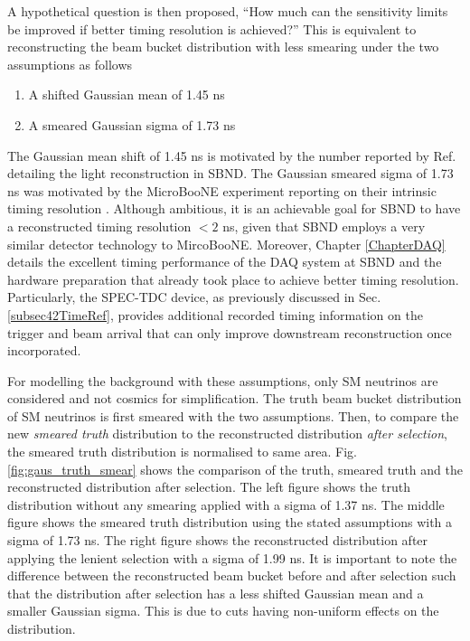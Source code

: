 A hypothetical question is then proposed, ``How much can the sensitivity limits be improved if better timing resolution is achieved?''
This is equivalent to reconstructing the beam bucket distribution with less smearing under the two assumptions as follows
\begin{enumerate}
    \item A shifted Gaussian mean of 1.45 ns
    \item A smeared Gaussian sigma of 1.73 ns
\end{enumerate}
The Gaussian mean shift of 1.45 ns is motivated by the number reported by Ref. \cite{sbnd_pds_paper} detailing the light reconstruction in SBND. 
The Gaussian smeared sigma of 1.73 ns was motivated by the MicroBooNE experiment reporting on their intrinsic timing resolution \cite{uboone_ns}.
Although ambitious, it is an achievable goal for SBND to have a reconstructed timing resolution $< 2$ ns, given that SBND employs a very similar detector technology to MircoBooNE.
Moreover, Chapter \ref{ChapterDAQ} details the excellent timing performance of the DAQ system at SBND and the hardware preparation that already took place to achieve better timing resolution.
Particularly, the SPEC-TDC device, as previously discussed in Sec. \ref{subsec42TimeRef}, provides additional recorded timing information on the trigger and beam arrival that can only improve downstream reconstruction once incorporated. 

For modelling the background with these assumptions, only SM neutrinos are considered and not cosmics for simplification. 
The truth beam bucket distribution of SM neutrinos is first smeared with the two assumptions.
Then, to compare the new \textit{smeared truth} distribution to the reconstructed distribution \textit{after selection}, the smeared truth distribution is normalised to same area.
Fig. \ref{fig:gaus_truth_smear} shows the comparison of the truth, smeared truth and the reconstructed distribution after selection.
The left figure shows the truth distribution without any smearing applied with a sigma of 1.37 ns.
The middle figure shows the smeared truth distribution using the stated assumptions with a sigma of 1.73 ns.
The right figure shows the reconstructed distribution after applying the lenient selection with a sigma of 1.99 ns.
It is important to note the difference between the reconstructed beam bucket before and after selection such that the distribution after selection has a less shifted Gaussian mean and a smaller Gaussian sigma.
This is due to cuts having non-uniform effects on the distribution. 

